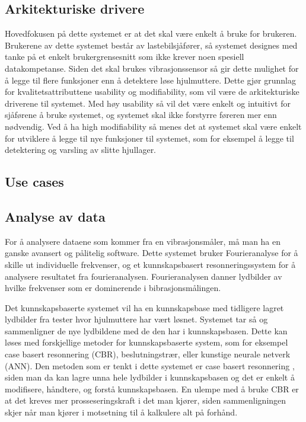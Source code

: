 \subsection{Arkitekturiske drivere}
Hovedfokusen på dette systemet er at det skal være enkelt å bruke for brukeren. 
Brukerene av dette systemet består av lastebilsjåfører, så systemet designes med tanke på et enkelt brukergrensesnitt som ikke krever noen spesiell datakompetanse. 
Siden det skal brukes vibrasjonssensor så gir dette mulighet for å legge til flere funksjoner enn å detektere løse hjulmuttere. 
Dette gjør grunnlag for kvalitetsattributtene usability og modifiability, som vil være de arkitekturiske driverene til systemet. 
Med høy usability så vil det være enkelt og intuitivt for sjåførene å bruke systemet, og systemet skal ikke forstyrre føreren mer enn nødvendig. 
Ved å ha high modifiability så menes det at systemet skal være enkelt for utviklere å legge til nye funksjoner til systemet, som for eksempel å legge til detektering og varsling av slitte hjullager.

\subsection{Use cases}


\subsection{Analyse av data}
For å analysere dataene som kommer fra en vibrasjonsmåler, må man ha en ganske avansert og pålitelig software. Dette systemet bruker Fourieranalyse \cite{Fourier} for å skille ut individuelle frekvenser, og et kunnskapsbasert resonneringssystem for å analysere resultatet fra fourieranalysen. Fourieranalysen danner lydbilder av hvilke frekvenser som er dominerende i bibrasjonsmålingen.

Det kunnskapsbaserte systemet vil ha en kunnskapsbase med tidligere lagret lydbilder fra tester hvor hjulmuttere har vært løsnet. Systemet tar så og sammenligner de nye lydbildene med de den har i kunnskapsbasen. Dette kan løses med forskjellige metoder for kunnskapsbaserte system, som for eksempel case basert resonnering (CBR), beslutningstrær, eller kunstige neurale netverk (ANN). Den metoden som er tenkt i dette systemet er case basert resonnering \cite{aamodt94}, siden man da kan lagre unna hele lydbilder i kunnskapsbasen og det er enkelt å modifisere, håndtere, og forstå kunnskapsbasen. En ulempe med å bruke CBR er at det kreves mer prosseseringskraft i det man kjører, siden sammenligningen skjer når man kjører i motsetning til å kalkulere alt på forhånd. 

